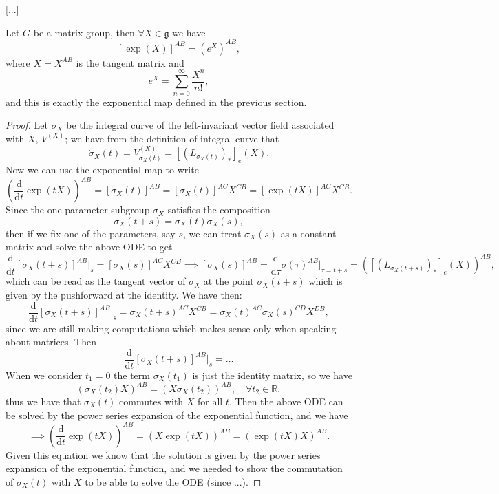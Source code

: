 [...]

\begin{proposition}
    Let $G$ be a matrix group, then \(\forall X \in \mathfrak{g}\) we have
    \[
        [\exp(X)]^{AB} = (e^X)^{AB},
    \]
    where \(X=X^{AB}\) is the tangent matrix and
    \[
        e^X = \sum_{n=0}^\infty \frac{X^n}{n!},
    \]
    and this is exactly the exponential map defined in the previous section.
\end{proposition}

\begin{proof}
    Let \(\sigma_{X}\) be the integral curve of the left-invariant vector field associated with \(X\), \(V^{(X)}\); we have from the definition of integral curve that
    \[
        \dot{\sigma}_{X}(t) = V^{(X)}_{\sigma_{X}(t)} = [(L_{\sigma_{X}(t)})_{*}]_e (X).
    \]
    Now we can use the exponential map to write
    \[
        (\frac{\mathrm{d} }{\mathrm{d} t} \exp(tX))^{AB} = [\dot{\sigma}_{X}(t)]^{AB} = [\sigma_{X}(t)]^{AC} X^{CB} = [\exp(tX)]^{AC} X^{CB}.
    \]
    Since the one parameter subgroup \(\sigma_{X}\) satisfies the composition
    \[
        \sigma_{X}(t+s) = \sigma_{X}(t) \sigma_{X}(s),
    \]
    then if we fix one of the parameters, say \(s\), we can treat \(\sigma_{X}(s)\) as a constant matrix and solve the above ODE to get
    \[
        \frac{\mathrm{d}}{\mathrm{d} t} [\sigma_{X}(t+s)]^{AB}\bigg|_{s} = [\sigma_{X}(s)]^{AC} X^{CB} \implies [\sigma_{X}(s)]^{AB} = \frac{\mathrm{d} }{\mathrm{d} \tau} \sigma(\tau)^{AB} \bigg|_{\tau=t+s} = \left( [(L_{\sigma_{X}(t+s)})_*]_e (X) \right)^{AB},
    \]
    which can be read as the tangent vector of \(\sigma_{X}\) at the point \(\sigma_{X}(t+s)\) which is given by the pushforward at the identity. We have then:
    \[
        \frac{\mathrm{d}}{\mathrm{d} t} [\sigma_{X}(t+s)]^{AB}\bigg|_{s} = \sigma_X(t+s)^{AC} X^{CB} = \sigma_X(t)^{AC} \sigma_X(s)^{CD} X^{DB},
    \]
    since we are still making computations which makes sense only when speaking about matrices. Then
    \[
        \frac{\mathrm{d}}{\mathrm{d} t} [\sigma_{X}(t+s)]^{AB}\bigg|_{s} = \dots
    \]
    When we consider \(t_1 = 0\) the term \(\sigma_{X}(t_1)\) is just the identity matrix, so we have
    \[
        (\sigma_X(t_2) X)^{AB} = (X \sigma_X(t_2))^{AB}, \quad \forall t_2 \in \mathbb{R},
    \]
    thus we have that \(\sigma_X(t)\) commutes with \(X\) for all \(t\). Then the above ODE can be solved by the power series expansion of the exponential function, and we have
    \[
        \implies (\frac{\mathrm{d} }{\mathrm{d} t} \exp(tX))^{AB} = (X \exp(tX))^{AB} = (\exp(tX) X)^{AB}.
    \]
    Given this equation we know that the solution is given by the power series expansion of the exponential function, and we needed to show the commutation of \(\sigma_X(t)\) with \(X\) to be able to solve the ODE (since ...).
\end{proof}